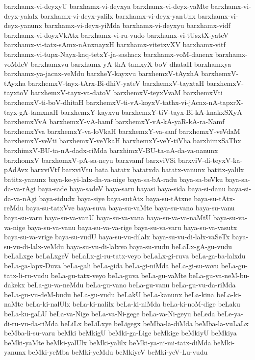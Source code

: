 {barxhamx-vi-deyxyU
barxhamx-vi-deyxya
barxhamx-vi-deyx-yaMte
barxhamx-vi-deyx-yalalx
barxhamx-vi-deyx-yalilx
barxhamx-vi-deyx-yanUnx
barxhamx-vi-deyx-yanunx
barxhamx-vi-deyx-yiMda
barxhamx-vi-deyxyu
barxhamx-vidf
barxhamx-vi-doyxVkAtx
barxhamx-vi-ru-vudo
barxhamx-vi-tUsxtX-yateV
barxhamx-vi-tatx-sAmx-nAnxnayxH
barxhamx-vitetxvXV
barxhamx-vitf
barxhamx-vi-tupx-Nayx-kaq-tetxY-ja-sashacx
barxhamx-voM-danenx
barxhamx-voMdeV
barxhamxvu
barxhamx-yA-thA-tamxyX-boV-dhataH
barxhamxya
barxhamx-ya-jacnx-veMdu
barxheY-kayxvu
barxhemxV-tAyxhA
barxhemxV-tAyxha
barxhemxV-tayx-tArx-Bi-dhiV-yateV
barxhemxV-tayxtaH
barxhemxV-tayxtoV
barxhemxV-tayx-va-datoV
barxhemxV-teyxVvaM
barxhemxVti
barxhemxV-ti-boV-dhitaH
barxhemxV-ti-vA-koyxV-tathx-vi-jAcnx-nA-tapxrX-tayx-gA-tamxnaH
barxhemxY-kayxvu
barxhemxY-tiV-tayx-Bi-kA-knakxSXyA
barxhemxYvA
barxhemxY-vA-hamf
barxhemxY-vA-kA-yaR-kA-ra-Namf
barxhemxYva
barxhemxY-va-loVkaH
barxhemxY-va-sanf
barxhemxY-veVdaM
barxhemxY-veVti
barxhemxY-veYkaH
barxhemxY-veY-tiVha
barxhimxSaThx
barxhimxV-BU-ta-nA-dadx-riMda
barxhimxV-BU-ta-nA-da-va-nanunx
barxhomxV
barxhomxV-pA-sa-neyu
barxvamf
barxviVSi
barxviV-di-teyxV-ka-pAdAvx
barxviVtf
barxviVtu
bata
batatx
batatxda
batatx-vanunx
batitx-yalilx
batitx-yanunx
baya-ke-yi-lalx-da-va-nige
baya-sa-bA-radu
baya-sa-beVku
baya-sa-da-va-rAgi
baya-sade
baya-sadeV
baya-saru
bayasi
baya-sida
baya-si-danu
baya-si-da-va-nAgi
baya-sidudx
baya-siye
baya-sutAtx
baya-su-tAtxne
baya-su-tAtx-reMdu
baya-su-tatxVve
baya-suva
baya-su-vaMte
baya-su-vano
baya-su-vanu
baya-su-varu
baya-su-va-vanU
baya-su-va-vana
baya-su-va-va-naMtU
baya-su-va-va-nige
baya-su-va-vanu
baya-su-va-va-rige
baya-su-va-varu
baya-su-va-vasutx
baya-su-va-vrige
baya-su-vudU
baya-su-vu-dilalx
baya-su-vu-di-lalx-vaSeTx
baya-su-vu-di-lalx-veMdu
baya-su-vu-di-lalxvo
baya-su-vudu
beLaLx-gA-gu-vudu
beLaLxge
beLaLxgeV
beLaLx-gi-ru-tatx-veyo
beLaLx-gi-ruva
beLa-ga-ba-lalxdu
beLa-ga-lapx-Duva
beLa-gali
beLa-gida
beLa-gi-niMda
beLa-gi-su-vavu
beLa-gu-tatx-li-ru-vudu
beLa-gu-tatx-veyo
beLa-guva
beLa-gu-vaMte
beLa-gu-va-neM-bu-dakekx
beLa-gu-va-neMdu
beLa-gu-vano
beLa-gu-vanu
beLa-gu-vu-da-riMda
beLa-gu-vu-deM-budu
beLa-gu-vudu
beLakU
beLa-kanunx
beLa-kina
beLa-ki-naMte
beLa-ki-nalUlx
beLa-ki-nalilx
beLa-ki-niMda
beLa-ki-noM-dige
beLaku
beLa-ku-gaLU
beLa-va-Nige
beLa-va-Ni-gege
beLa-va-Ni-geyu
beLeda
beLe-ya-di-ru-vu-da-riMda
beLiLx
beLiLxye
beLigegx
beMba-la-diMda
beMba-la-vuLaLx
beMba-li-su-varu
beMki
beMkigU
beMki-ga-Lige
beMkige
beMkiyU
beMkiya
beMki-yaMte
beMki-yalUlx
beMki-yalilx
beMki-ya-ni-mi-tatx-diMda
beMki-yanunx
beMki-yeMba
beMki-yeMdu
beMkiyeV
beMki-yeV-Lu-vudu
}
